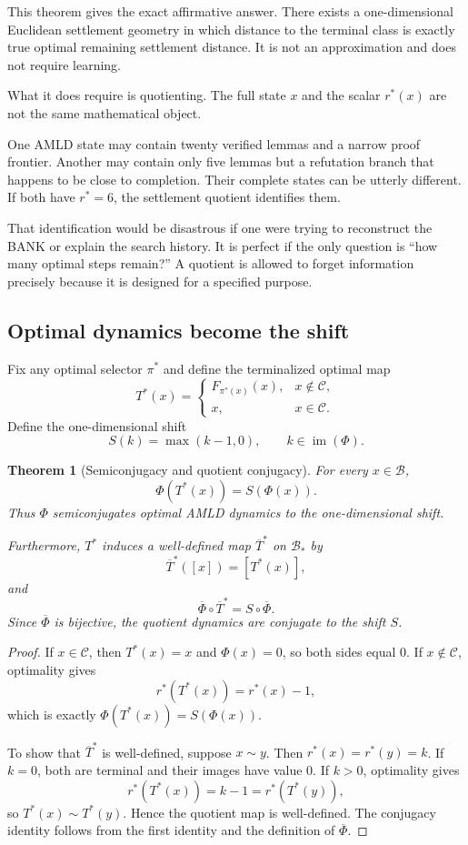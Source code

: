 \documentclass[11pt,letterpaper]{article}
\newtheorem{theorem}{Theorem}[section]
\theoremstyle{remark}
\newcommand{\Cset}{\mathcal C}
\newcommand{\Basin}{\mathcal B}
\newcommand{\rstar}{r^{\!*}}
\newcommand{\im}{\operatorname{im}}
\begin{document}
This theorem gives the exact affirmative answer. There exists a one-dimensional Euclidean settlement geometry in which distance to the terminal class is exactly true optimal remaining settlement distance. It is not an approximation and does not require learning.

What it does require is quotienting. The full state $x$ and the scalar $\rstar(x)$ are not the same mathematical object.

\begin{storybox}
One AMLD state may contain twenty verified lemmas and a narrow proof frontier. Another may contain only five lemmas but a refutation branch that happens to be close to completion. Their complete states can be utterly different. If both have $\rstar=6$, the settlement quotient identifies them.

That identification would be disastrous if one were trying to reconstruct the BANK or explain the search history. It is perfect if the only question is ``how many optimal steps remain?'' A quotient is allowed to forget information precisely because it is designed for a specified purpose.
\end{storybox}

\subsection{Optimal dynamics become the shift}

Fix any optimal selector $\pi^*$ and define the terminalized optimal map
\[
T^*(x)=
\begin{cases}
F_{\pi^*(x)}(x),&x\notin\Cset,\\
x,&x\in\Cset.
\end{cases}
\]
Define the one-dimensional shift
\[
S(k)=\max(k-1,0),\qquad k\in\im(\Phi).
\]

\begin{theorem}[Semiconjugacy and quotient conjugacy]\label{thm:conjugacy}
For every $x\in\Basin$,
\[
\boxed{\Phi(T^*(x))=S(\Phi(x)).}
\]
Thus $\Phi$ semiconjugates optimal AMLD dynamics to the one-dimensional shift.

Furthermore, $T^*$ induces a well-defined map $\overline T^*$ on $\Basin_{\!*}$ by
\[
\overline T^*([x])=[T^*(x)],
\]
and
\[
\boxed{\overline\Phi\circ\overline T^*=S\circ\overline\Phi.}
\]
Since $\overline\Phi$ is bijective, the quotient dynamics are conjugate to the shift $S$.
\end{theorem}

\begin{proof}
If $x\in\Cset$, then $T^*(x)=x$ and $\Phi(x)=0$, so both sides equal $0$. If $x\notin\Cset$, optimality gives
\[
\rstar(T^*(x))=\rstar(x)-1,
\]
which is exactly $\Phi(T^*(x))=S(\Phi(x))$.

To show that $\overline T^*$ is well-defined, suppose $x\sim y$. Then $\rstar(x)=\rstar(y)=k$. If $k=0$, both are terminal and their images have value $0$. If $k>0$, optimality gives
\[
\rstar(T^*(x))=k-1=\rstar(T^*(y)),
\]
so $T^*(x)\sim T^*(y)$. Hence the quotient map is well-defined. The conjugacy identity follows from the first identity and the definition of $\overline\Phi$.
\end{proof}
\end{document}
